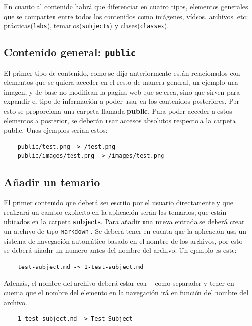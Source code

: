 En cuanto al contenido habrá que diferenciar en cuatro tipos, elementos generales que se comparten entre todos los contenidos como imágenes, vídeos, archivos, etc; prácticas(\verb|labs|), temarios(\verb|subjects|) y clases(\verb|classes|).

\subsection{Contenido general: {\tt public}}

El primer tipo de contenido, como se dijo anteriormente están relacionados con elementos que se quiera acceder en el resto de manera general, un ejemplo una imagen, y de base no modifican la pagina web que se crea, sino que sirven para expandir el tipo de información a poder usar en los contenidos posteriores. Por esto se proporciona una carpeta llamada \textbf{public}. Para poder acceder a estos elementos a posterior, se deberán usar accesos absolutos respecto a la carpeta public. Unos ejemplos serían estos:

\begin{verbatim}
    public/test.png -> /test.png
    public/images/test.png -> /images/test.png
\end{verbatim}

\subsection{Añadir un temario}

El primer contenido que deberá ser escrito por el usuario directamente y que realizará un cambio explicito en la aplicación serán los temarios, que están ubicados en la carpeta \textbf{subjects}. Para añadir una nueva entrada se deberá crear un archivo de tipo \verb|Markdown| \cite{md}. Se deberá tener en cuenta que la aplicación usa un sistema de navegación automático basado en el nombre de los archivos, por esto se deberá añadir un numero antes del nombre del archivo. Un ejemplo es este:

\begin{verbatim}
    test-subject.md -> 1-test-subject.md
\end{verbatim}

Además, el nombre del archivo deberá estar con \verb|-| como separador y tener en cuenta que el nombre del elemento en la navegación irá en función del nombre del archivo.

\begin{verbatim}
    1-test-subject.md -> Test Subject
\end{verbatim}

